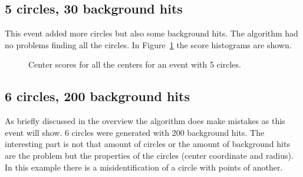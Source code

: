 \documentclass[11pt]{scrreprt}
\begin{document}

\subsection{5 circles, 30 background hits} %
\label{sub:2d_hough_transform_5_circles_30_background_hits}

This event added more circles but also some background hits. The algorithm had no problems finding
all the circles. In Figure~\ref{fig:2d_5_circles_30_bg_radius} the score histograms are shown.

\begin{figure}[htbp]
  \centering
  
  
  \caption{Center scores for all the centers for an event with 5 circles.}
  \label{fig:2d_5_circles_30_bg_radius}
\end{figure}


\subsection{6 circles, 200 background hits} %
\label{sub:2d_hough_transform_6_circles_200_background_hits}
As briefly discussed in the overview the algorithm does make mistakes as this event will show. 6 circles 
were generated with 200 background hits. The interesting part is not that amount of circles or the amount
of background hits are the problem but the properties of the circles (center coordinate and radius). In 
this example there is a misidentification of a circle with points of another.
\end{document}
